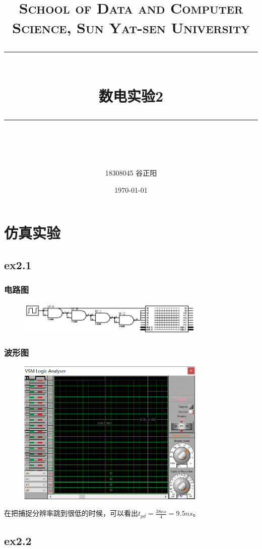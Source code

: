 \documentclass[UTF8, a4paper, 11pt]{article}
\title{	
\normalfont \normalsize
\textsc{School of Data and Computer Science, Sun Yat-sen University} \\ [25pt] %
\rule{\textwidth}{0.5pt} \\[0.4cm] %
\huge 数电实验2\\ %
\rule{\textwidth}{2pt} \\[0.5cm] %
\author{18308045 谷正阳}
\date{\normalsize\today}
}
\begin{document}
\maketitle
\tableofcontents
\newpage
\section{仿真实验}
\subsection{ex2.1}
\subsubsection{电路图}
\begin{figure}[H]
    \centering
    \includegraphics[width=0.8\textwidth]{ex2.1电路图.jpg}
\end{figure}
\subsubsection{波形图}
\begin{figure}[H]
    \centering
    \includegraphics[width=0.8\textwidth]{ex2.1波形图.png}
\end{figure}
在把捕捉分辨率跳到很低的时候，可以看出$t_{pd}=\frac{38ns}4=9.5ns$。
\subsection{ex2.2}
\end{document}

